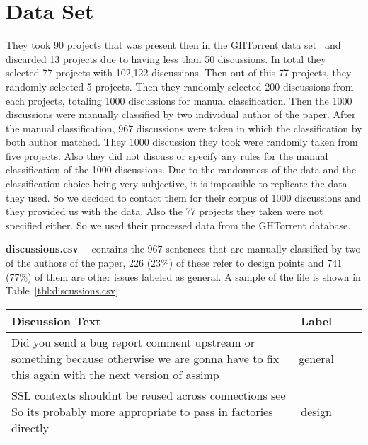 \section{Data Set}
\label{sect:dataset}
They took 90 projects that was present then in the GHTorrent data set~\cite{Gousios2013} and discarded 13 projects due to having less than 50 discussions. In total they selected 77 projects with 102,122 discussions. Then out of this 77 projects, they randomly selected 5 projects. Then they randomly selected 200 discussions from each projects, totaling 1000 discussions for manual classification. Then the 1000 discussions were manually classified by two individual author of the paper. After the manual classification, 967 discussions were taken in which the classification by both author matched. They 1000 discussion they took were randomly taken from five projects. Also they did not discuss or specify any rules for the manual classification of the 1000 discussions. Due to the randomness of the data and the classification choice being very subjective, it is impossible to replicate the data they used. So we decided to contact them for their corpus of 1000 discussions and they provided us with the data. Also the 77 projects they taken were not specified either. So we used their processed data from the GHTorrent database.

\noindent\textbf{discussions.csv}--- contains the 967 sentences that are manually classified by two of the authors of the paper, 226 (23\%) of these refer to design points and 741 (77\%) of them are other issues labeled as general. A sample of the file is shown in Table~\ref{tbl:discussions.csv}
\begin{table*}
	\centering
	\caption{Data sample in discussions.csv}
	\label{tbl:discussions.csv}
	\begin{tabular}{lccc} 
		\toprule
		\textbf{Discussion Text} & \textbf{Label}  \\
		\midrule
		Did you send a bug report comment upstream or something because otherwise we are gonna have to fix this again with the next version of assimp & general \\
		SSL contexts shouldnt be reused across connections see So its probably more appropriate to pass in factories directly & design \\
		\bottomrule
	\end{tabular}
\end{table*}


